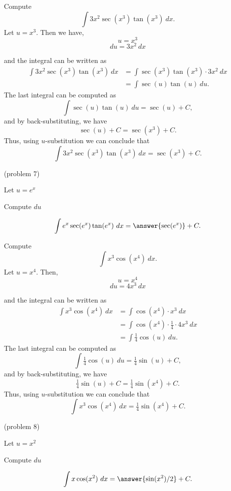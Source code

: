 \documentclass[handout]{ximera}
\begin{document}
\begin{example}[example 7] Compute 
\[\int 3x^2\sec(x^3)\tan(x^3) \ dx.\]
Let $u = x^3$.  Then we have,
\[u = x^3\]
\[du = 3x^2 \ dx\]

and the integral can be written as 
\begin{align*}
\int 3x^2\sec(x^3)\tan(x^3) \ dx &= \int \sec(x^3)\tan(x^3) \cdot 3x^2 \ dx\\
&= \int \sec(u)\tan(u) \ du.
\end{align*}
The last integral can be computed as 
\[\int \sec(u)\tan(u) \ du = \sec(u) + C,\]
and by back-substituting, we have 
\[\sec(u) + C = \sec(x^3) + C.\]
Thus, using $u$-substitution we can conclude that
\[\int 3x^2\sec(x^3)\tan(x^3) \ dx =  \sec(x^3) + C.\]
\end{example}

\begin{problem}(problem 7)
\begin{hint}
Let $u = e^x$
\end{hint}
\begin{hint}
Compute $du$
\end{hint}
\[\int e^x\sec(e^x)\tan(e^x) \ dx = \answer{\sec(e^x)} +C.\]
\end{problem}


\begin{example}[example 8] Compute 
\[\int x^3\cos(x^4) \ dx.\]
Let $u = x^4$.  Then,
\[u = x^4\]
\[du = 4x^3 \ dx\]

and the integral can be written as 
\begin{align*}
\int x^3\cos(x^4) \ dx &= \int \cos(x^4) \cdot x^3\  dx \\
&=  \int \cos(x^4)\cdot \tfrac14 \cdot 4x^3\  dx\\
&=  \int \tfrac14\cos(u) \ du.
\end{align*}
The last integral can be computed as 
\[\int \tfrac14 \cos(u) \ du = \tfrac14 \sin(u) + C,\]
and by back-substituting, we have 
\[\tfrac14 \sin(u) + C = \tfrac14 \sin(x^4) + C.\]
Thus, using $u$-substitution we can conclude that
\[\int x^3\cos(x^4) \ dx =  \tfrac14 \sin(x^4) + C.\]
\end{example}

\begin{problem}(problem 8)
\begin{hint}
Let $u = x^2$
\end{hint}
\begin{hint}
Compute $du$
\end{hint}
\[\int x\cos(x^2) \ dx = \answer{\sin(x^2)/2} +C.\]
\end{problem}
\end{document}
